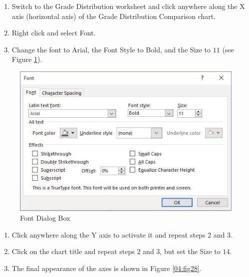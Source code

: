 \begin{enumerate}
	\item Switch to the Grade Distribution worksheet and click anywhere along the X axis (horizontal axis) of the Grade Distribution Comparison chart.
	\item Right click and select Font.
	\item Change the font to Arial, the Font Style to Bold, and the Size to $ 11 $ (see Figure \ref{04:fig27}).
\end{enumerate}


\begin{figure}[H]
	\centering
	\includegraphics[width=\maxwidth{.95\linewidth}]{gfx/ch04_fig27}
	\caption{Font Dialog Box}
	\label{04:fig27}
\end{figure}

\begin{enumerate}[resume]
	\item Click anywhere along the Y axis to activate it and repeat steps $ 2 $ and $ 3 $.
	\item Click on the chart title and repeat steps $ 2 $ and $ 3 $, but set the Size to $ 14 $.
	\item The final appearance of the axes is shown in Figure \ref{04:fig28}.
\end{enumerate}

